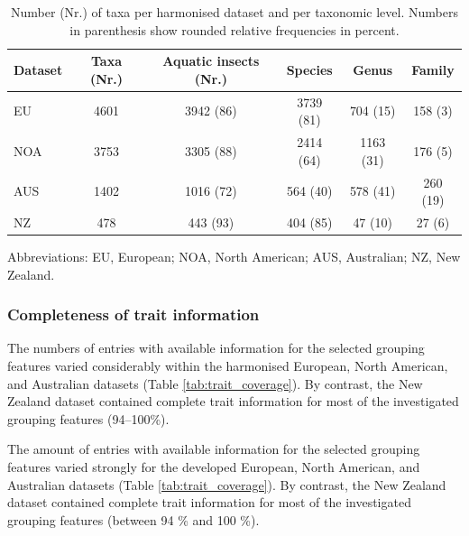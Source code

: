 \documentclass{article}
\begin{document}
\begin{table}[ht]
    \centering
    \caption{Number (Nr.) of taxa per harmonised dataset and per taxonomic level. Numbers in parenthesis show rounded relative frequencies in percent.} 
    \label{tab:tax_coverage}
    \begin{tabular}{lccccc}
    \toprule[.1em]
    Dataset & Taxa (Nr.) & Aquatic insects (Nr.) & Species & Genus & Family \\ 
    \toprule[.1em]
    EU & 4601 & 3942 (86) & 3739 (81) & 704 (15) & 158 (3) \\ 
    NOA & 3753 & 3305 (88) & 2414 (64) & 1163 (31) & 176 (5)  \\ 
    AUS & 1402 & 1016 (72) & 564 (40) & 578 (41) & 260 (19) \\ 
    NZ & 478 & 443 (93) & 404 (85) & 47 (10) & 27 (6) \\ 
    \bottomrule
    \end{tabular}
\end{table}
\begin{minipage}{\linewidth}{\fontsize{8}{10}\selectfont
\centering
Abbreviations: EU, European; NOA, North American; AUS, Australian; NZ, New Zealand.
}
\end{minipage}


\subsubsection*{Completeness of trait information}

The numbers of entries with available information for the selected grouping features varied considerably within the harmonised European, North American, and Australian datasets (Table \ref{tab:trait_coverage}). By contrast, the New Zealand dataset contained complete trait information for most of the investigated grouping features (94–100\%).

The amount of entries with available information for the selected grouping features varied strongly for the developed European, North American, and Australian datasets (Table \ref{tab:trait_coverage}). By contrast, the New Zealand dataset contained complete trait information for most of the investigated grouping features (between 94 \% and 100 \%).
\end{document}
